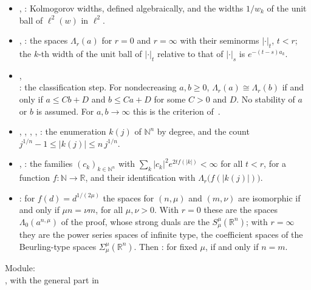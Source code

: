 \documentclass[11pt]{article}
\theoremstyle{definition}
\begin{document}
\begin{itemize}
  \item {}, : Kolmogorov
    widths, defined algebraically, and the widths $1/w_k$ of the unit ball of $\ell^2(w)$ in
    $\ell^2$.
  \item {}, : the spaces
    $\Lambda_r(a)$ for $r = 0$ and $r = \infty$ with their seminorms $|\cdot|_t$, $t < r$; the
    $k$-th width of the unit ball of $|\cdot|_t$ relative to that of $|\cdot|_s$ is
    $e^{-(t-s)a_k}$.
  \item {},\\
    : the classification step.
    For nondecreasing $a, b \ge 0$, $\Lambda_r(a) \cong \Lambda_r(b)$ if and only if
    $a \le Cb + D$ and $b \le Ca + D$ for some $C > 0$ and $D$. No stability of $a$ or $b$ is
    assumed. For $a, b \to \infty$ this is the criterion of~\cite[Thm.~5.12]{vogt}.
  \item {}, , ,
    , : the enumeration
    $k(j)$ of $\mathbb N^n$ by degree, and the count
    $j^{1/n} - 1 \le |k(j)| \le n\,j^{1/n}$.
  \item {}, : the families
    $(c_k)_{k \in \mathbb N^n}$ with $\sum_k |c_k|^2 e^{2tf(|k|)} < \infty$ for all $t < r$, for
    a function $f \colon \mathbb N \to \mathbb R$, and their identification with
    $\Lambda_r\bigl(f(|k(j)|)\bigr)$.
  \item {}: for
    $f(d) = d^{1/(2\mu)}$ the spaces for $(n, \mu)$ and $(m, \nu)$ are isomorphic if and only if
    $\mu n = \nu m$, for all $\mu, \nu > 0$. With $r = 0$ these are the spaces
    $\Lambda_0(a^{n,\mu})$ of the proof, whose strong duals are the $S^\mu_\mu(\mathbb R^n)$;
    with $r = \infty$ they are the power series spaces of infinite type, the coefficient spaces
    of the Beurling-type spaces $\Sigma^\mu_\mu(\mathbb R^n)$. Then
    : for fixed $\mu$, if and only
    if $n = m$.
\end{itemize}
Module:\\ , with the general part in\\
\end{document}
